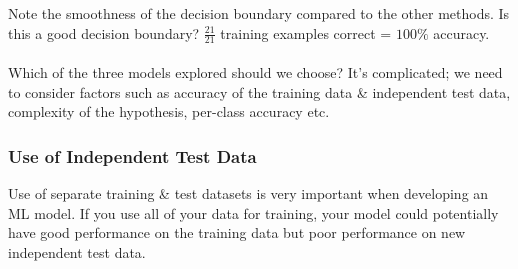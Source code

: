\documentclass[a4paper,11pt]{article}
\begin{document}
Note the smoothness of the decision boundary compared to the other methods.
Is this a good decision boundary?
$\frac{21}{21}$ training examples correct = $100\%$ accuracy.
\\\\
Which of the three models explored should we choose?
It's complicated; we need to consider factors such as accuracy of the training data \& independent test data,
complexity of the hypothesis, per-class accuracy etc.

\subsubsection{Use of Independent Test Data}
Use of separate training \& test datasets is very important when developing an ML model.
If you use all of your data for training, your model could potentially have good performance on the training data
but poor performance on new independent test data.
\end{document}
